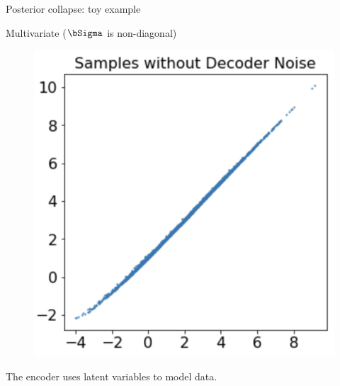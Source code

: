 \begin{frame}{Posterior collapse: toy example}
\begin{block}{Multivariate ($\bSigma$ is non-diagonal)}
\begin{minipage}[t]{0.33\columnwidth}
\begin{figure}[h]
			\end{figure}
		\end{minipage}%
		\begin{minipage}[t]{0.33\columnwidth}
			\begin{figure}[h]
				\centering
				\includegraphics[width=.75\linewidth]{figs/posterior_collapse_toy_5.png}
			\end{figure}
		\end{minipage}
	The encoder uses latent variables to model data.
	\end{block}


\end{frame}
